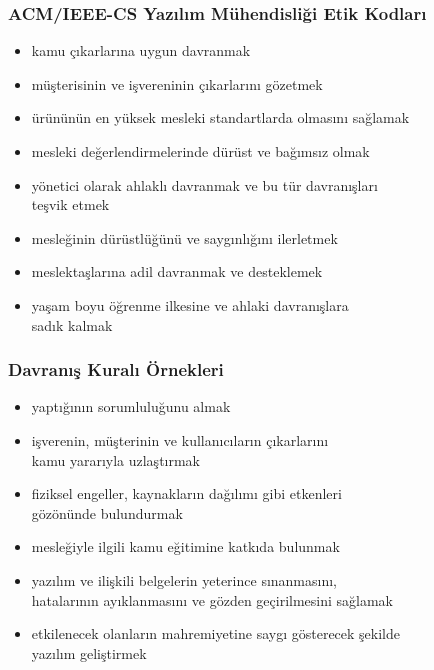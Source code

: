 \documentclass[dvipsnames]{beamer}
\theoremstyle{definition}
\theoremstyle{example}
\theoremstyle{plain}
\begin{document}

\begin{frame}
  \frametitle{ACM/IEEE-CS Yazılım Mühendisliği Etik Kodları}

  \begin{itemize}
    \item kamu çıkarlarına uygun davranmak
    \item müşterisinin ve işvereninin çıkarlarını gözetmek
    \item ürününün en yüksek mesleki standartlarda olmasını sağlamak
    \item mesleki değerlendirmelerinde dürüst ve bağımsız olmak
    \item yönetici olarak ahlaklı davranmak ve bu tür davranışları\\
      teşvik etmek
    \item mesleğinin dürüstlüğünü ve saygınlığını ilerletmek
    \item meslektaşlarına adil davranmak ve desteklemek
    \item yaşam boyu öğrenme ilkesine ve ahlaki davranışlara\\
      sadık kalmak
  \end{itemize}
\end{frame}

\begin{frame}
  \frametitle{Davranış Kuralı Örnekleri}

  \begin{itemize}
    \item yaptığının sorumluluğunu almak
    \item işverenin, müşterinin ve kullanıcıların çıkarlarını\\
      kamu yararıyla uzlaştırmak
    \item fiziksel engeller, kaynakların dağılımı gibi etkenleri\\
      gözönünde bulundurmak
    \item mesleğiyle ilgili kamu eğitimine katkıda bulunmak
    \item yazılım ve ilişkili belgelerin yeterince sınanmasını,\\
      hatalarının ayıklanmasını ve gözden geçirilmesini sağlamak
    \item etkilenecek olanların mahremiyetine saygı gösterecek şekilde\\
      yazılım geliştirmek
  \end{itemize}
\end{frame}
\end{document}
